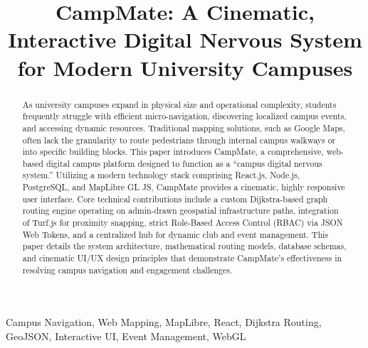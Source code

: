 \documentclass[conference]{IEEEtran}
\begin{document}
\title{CampMate: A Cinematic, Interactive Digital Nervous System for Modern University Campuses}

\author{
\and
{}
}

\maketitle

\begin{abstract}
As university campuses expand in physical size and operational complexity, students frequently struggle with efficient micro-navigation, discovering localized campus events, and accessing dynamic resources. Traditional mapping solutions, such as Google Maps, often lack the granularity to route pedestrians through internal campus walkways or into specific building blocks. This paper introduces CampMate, a comprehensive, web-based digital campus platform designed to function as a ``campus digital nervous system.'' Utilizing a modern technology stack comprising React.js, Node.js, PostgreSQL, and MapLibre GL JS, CampMate provides a cinematic, highly responsive user interface. Core technical contributions include a custom Dijkstra-based graph routing engine operating on admin-drawn geospatial infrastructure paths, integration of Turf.js for proximity snapping, strict Role-Based Access Control (RBAC) via JSON Web Tokens, and a centralized hub for dynamic club and event management. This paper details the system architecture, mathematical routing models, database schemas, and cinematic UI/UX design principles that demonstrate CampMate's effectiveness in resolving campus navigation and engagement challenges.
\end{abstract}

\begin{IEEEkeywords}
Campus Navigation, Web Mapping, MapLibre, React, Dijkstra Routing, GeoJSON, Interactive UI, Event Management, WebGL
\end{IEEEkeywords}
\end{document}
